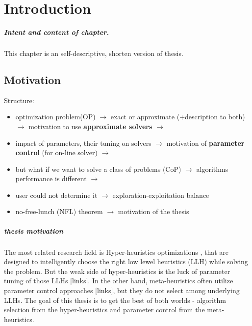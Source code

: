 \chapter{Introduction}\label{intro}
\paragraph{Intent and content of chapter.} This chapter is an self-descriptive, shorten version of thesis.



\section{Motivation}
Structure:
\begin{itemize}
	\item optimization problem(OP) $\rightarrow$ exact or approximate (+description to both) $\rightarrow$ motivation to use \textbf{approximate solvers} $\rightarrow$
	\item impact of parameters, their tuning on solvers $\rightarrow$ motivation of \textbf{parameter control} (for on-line solver) $\rightarrow$
	\item but what if we want to solve a class of problems (CoP) $\rightarrow$ algorithms performance is different $\rightarrow$ 
	\item user could not determine it \cite{surv:kerschke2019automated} $\rightarrow$ exploration-exploitation balance
	\item no-free-lunch (NFL) theorem \cite{wolpert1997no} $\rightarrow$ motivation of the thesis
\end{itemize}

\paragraph{thesis motivation} The most related research field is Hyper-heuristics optimizations \cite{burke2003hyper}, that are designed to intelligently choose the right low lewel heuristics (LLH) while solving the problem.
But the weak side of hyper-heuristics is the luck of parameter tuning of those LLHs [links].
In the other hand, meta-heuristics often utilize parameter control approaches [links], but they do not select among underlying LLHs.
The goal of this thesis is to get the best of both worlds - algorithm selection from the hyper-heuristics and parameter control from the meta-heuristics.


